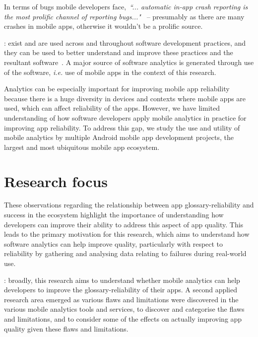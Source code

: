 In terms of bugs mobile developers face,~\emph{``... automatic in-app crash reporting is the most prolific channel of reporting bugs..."}~ %
-- presumably as there are many crashes in mobile apps, otherwise it wouldn't be a prolific source. 

\medskip

: exist and are used across and throughout software development practices, and they can be used to better understand and improve these practices and the resultant software~. A major source of software analytics is generated through use of the software, \emph{i.e.} use of mobile apps in the context of this research.

Analytics can be especially important for improving mobile app reliability because there is a huge diversity in devices and contexts where mobile apps are used, which can affect reliability of the apps. However, we have limited understanding of how software developers apply mobile analytics in practice for improving app reliability. To address this gap, we study the use and utility of mobile analytics by multiple Android mobile app development projects, the largest and most ubiquitous mobile app ecosystem.

\section{Research focus}
These observations regarding the relationship between app \gls{glossary-reliability} and success in the ecosystem highlight the importance of understanding how developers can improve their ability to address this aspect of app quality. This leads to the primary motivation for this research, which aims to understand how software analytics can help improve quality, particularly with respect to reliability by gathering and analysing data relating to failures during real-world use.

: broadly, this research aims to understand whether mobile analytics can help developers to improve the \gls{glossary-reliability} of their apps. A second applied research area emerged as various flaws and limitations were discovered in the various mobile analytics tools and services, to discover and categorise the flaws and limitations, and to consider some of the effects on actually improving app quality given these flaws and limitations.


